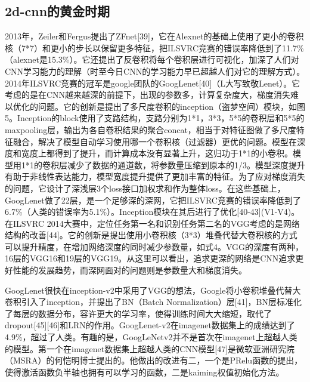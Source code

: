 \documentclass[15pt]{article}
\begin{document}
\subsection{2d-cnn的黄金时期}
2013年，Zeiler和Fergus提出了ZFnet[39]，它在Alexnet的基础上使用了更小的卷积核（7*7）和更小的步长以保留更多特征，把ILSVRC竞赛的错误率降低到了11.7\%（alexnet是15.3\%）。它还提出了反卷积将每个卷积层进行可视化，加深了人们对CNN学习能力的理解（时至今日CNN的学习能力早已超越人们对它的理解方式）。2014年ILSVRC竞赛的冠军是google团队的GoogLenet[40]（L大写致敬Lenet）。它考虑的是在CNN越来越深的前提下，出现的参数多，计算复杂度大，梯度消失难以优化的问题。它的创新是提出了多尺度卷积的inception（盗梦空间）模块，如图5。Inception的block使用了支路结构，支路分别为1*1，3*3，5*5的卷积层和5*5的maxpooling层，输出为各自卷积结果的聚合concat，相当于对特征图做了多尺度特征融合，解决了模型自动学习使用哪一个卷积核（过滤器）更优的问题。模型在深度和宽度上都得到了提升，而计算成本没有显著上升，这归功于1*1的小卷积。模型用1*1的卷积层减少了数据的通道数，将参数量压缩到原本的1/3。模型深度提升有助于非线性表达能力，模型宽度提升提供了更加丰富的特征。为了应对梯度消失的问题，它设计了深浅层3个loss接口加权求和作为整体loss。在这些基础上，GoogLenet做了22层，是一个足够深的深网，它把ILSVRC竞赛的错误率降低到了6.7\%（人类的错误率为5.1\%）。Inception模块在其后进行了优化[40-43](V1-V4)。在ILSVRC 2014大赛中，定位任务第一名和识别任务第二名的VGG考虑的是网络结构的改善[44]。它的创新是提出使用小卷积核（3*3）堆叠代替大卷积核的方式可以提升精度，在增加网络深度的同时减少参数量，如式4。VGG的深度有两种，16层的VGG16和19层的VGG19。从这里可以看出，追求更深的网络是CNN追求更好性能的发展趋势，而深网面对的问题则是参数量大和梯度消失。

GoogLenet很快在inception-v2中采用了VGG的想法，Google将小卷积堆叠代替大卷积引入了inception，并提出了BN（Batch Normalization）层[41]，BN层标准化了每层的数据分布，容许更大的学习率，使得训练时间大大缩短，取代了dropout[45][46]和LRN的作用。GoogLenet-v2在imagenet数据集上的成绩达到了4.9\%，超过了人类。有趣的是，GoogLeNetv2并不是首次在imagenet上超越人类的模型。第一个在imagenet数据集上超越人类的CNN模型[47]是微软亚洲研究院（MSRA）的何恺明博士提出的。他做出的改进有二，一个是PRelu函数的提出，使得激活函数负半轴也拥有可以学习的函数，二是kaiming权值初始化方法。
\end{document}
